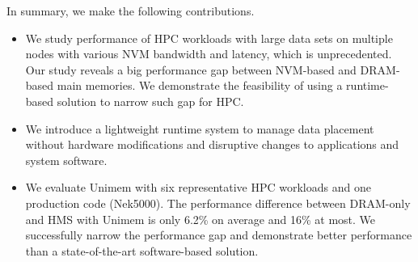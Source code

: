 In summary, we make the following contributions.
\begin{itemize}
    \item We study performance of HPC workloads with large data sets on multiple nodes with various NVM bandwidth and latency, which is unprecedented. 
    Our study reveals a big performance gap between NVM-based and DRAM-based main memories. 
    We demonstrate the feasibility of using a runtime-based solution 
    to narrow such gap for HPC.
    \item We introduce a lightweight runtime system to manage data placement without
    hardware modifications and disruptive changes to applications and system software.
    \item We evaluate Unimem with six representative HPC workloads and one production code (Nek5000). The performance difference between DRAM-only and HMS with Unimem is only 6.2\% on average and 16\% at most. We successfully narrow the performance gap and demonstrate better performance than a state-of-the-art software-based solution.
\end{itemize}

\begin{comment}
Different GPU hetero, there is no programm challening.
But performance challenges
The challenges to use the heterogeneous memory.
(1) bandwidth vs. latency; (2) runtime overhead;
(3) must be adaptive to the application phase changes
These execution phases are sensitive to NVM higher latency or lower bandwidth or both.
Determine the placement is challenging. Runtime overhead
\\


This study has clearly demonstrated that runtime data management


The runtime provides a transparent runtime adaptation of HPC codes,
and requires only a trivial code instrumentation step.
\end{comment}

